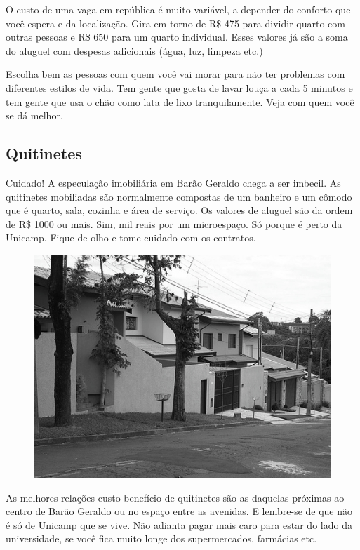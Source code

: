 O custo de uma vaga em república é muito variável, a depender do conforto que
você espera e da localização. Gira em torno de R\$ 475 para dividir quarto com
outras pessoas e R\$ 650 para um quarto individual. Esses valores já são a soma
do aluguel com despesas adicionais (água, luz, limpeza etc.)

Escolha bem as pessoas com quem você vai morar para não ter problemas com
diferentes estilos de vida. Tem gente que gosta de lavar louça a cada 5 minutos
e tem gente que usa o chão como lata de lixo tranquilamente. Veja com quem você
se dá melhor.

\subsection{Quitinetes}

Cuidado! A especulação imobiliária em Barão Geraldo chega a ser imbecil. As
quitinetes mobiliadas são normalmente compostas de um banheiro e um cômodo que é
quarto, sala, cozinha e área de serviço. Os valores de aluguel são da ordem de
R\$ 1000 ou mais. Sim, mil reais por um microespaço. Só porque é perto da
Unicamp. Fique de olho e tome cuidado com os contratos.

\begin{figure}[h!]
    \centering
    \includegraphics[scale=0.55,keepaspectratio=true]{img/imgs/5-moradia/-033.jpg}
\end{figure}

As melhores relações custo-benefício de quitinetes são as daquelas próximas ao
centro de Barão Geraldo ou no espaço entre as avenidas. E lembre-se de que não é
só de Unicamp que se vive. Não adianta pagar mais caro para estar do lado da
universidade, se você fica muito longe dos supermercados, farmácias etc.

